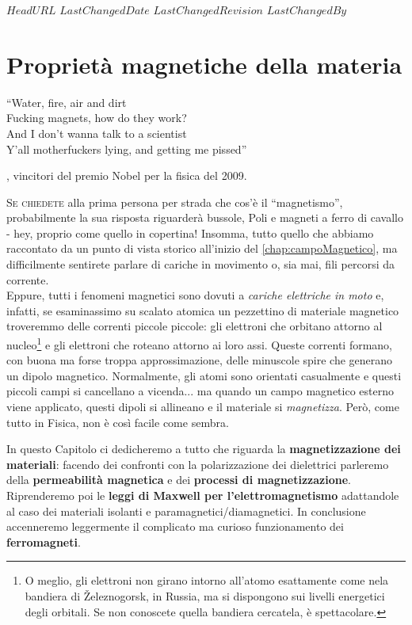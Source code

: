 \svnidlong
{$HeadURL$}
{$LastChangedDate$}
{$LastChangedRevision$}
{$LastChangedBy$}

\chapter{Proprietà magnetiche della materia}

\begin{introduction}
	``Water, fire, air and dirt\\
	Fucking magnets, how do they work?\\
	And I don’t wanna talk to a scientist\\
	Y’all motherfuckers lying, and getting me pissed''
	\begin{flushright}
		, vincitori del premio Nobel per la fisica del 2009.
	\end{flushright}
\end{introduction}
\lettrine[findent=1pt, nindent=0pt]{S}{e chiedete} alla prima persona per strada che cos'è il ``magnetismo'', probabilmente la sua risposta riguarderà bussole, Poli e magneti a ferro di cavallo - hey, proprio come quello in copertina! Insomma, tutto quello che abbiamo raccontato da un punto di vista storico all'inizio del \autoref{chap:campoMagnetico}, ma difficilmente sentirete parlare di cariche in movimento o, sia mai, fili percorsi da corrente.\\
Eppure, tutti i fenomeni magnetici sono dovuti a \textit{cariche elettriche in moto} e, infatti, se esaminassimo su scalato atomica un pezzettino di materiale magnetico troveremmo delle correnti piccole piccole: gli elettroni che orbitano attorno al nucleo\footnote{O meglio, gli elettroni non girano intorno all'atomo esattamente come nela bandiera di Železnogorsk, in Russia, ma si dispongono sui livelli energetici degli orbitali. Se non conoscete quella bandiera cercatela, è spettacolare.} e gli elettroni che roteano attorno ai loro assi. Queste correnti formano, con buona ma forse troppa approssimazione, delle minuscole spire che generano un dipolo magnetico. Normalmente, gli atomi sono orientati casualmente e questi piccoli campi si cancellano a vicenda... ma quando un campo magnetico esterno viene applicato, questi dipoli si allineano e il materiale si \textit{magnetizza}. Però, come tutto in Fisica, non è così facile come sembra.

In questo Capitolo ci dedicheremo a tutto che riguarda la \textbf{magnetizzazione dei materiali}: facendo dei confronti con la polarizzazione dei dielettrici parleremo della \textbf{permeabilità magnetica} e dei \textbf{processi di magnetizzazione}. Riprenderemo poi le \textbf{leggi di Maxwell per l'elettromagnetismo} adattandole al caso dei materiali isolanti e paramagnetici/diamagnetici. In conclusione accenneremo leggermente il complicato ma curioso funzionamento dei \textbf{ferromagneti}.
